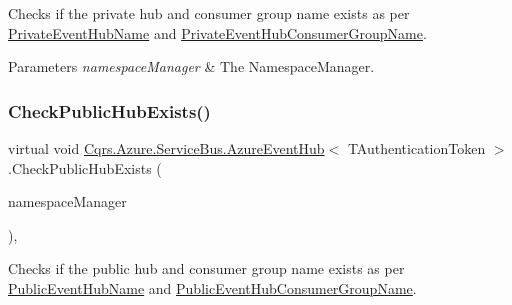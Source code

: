 Checks if the private hub and consumer group name exists as per \hyperlink{classCqrs_1_1Azure_1_1ServiceBus_1_1AzureEventHub_ac6802047e00a92ea4b0ae6b69ef7310a_ac6802047e00a92ea4b0ae6b69ef7310a}{Private\+Event\+Hub\+Name} and \hyperlink{classCqrs_1_1Azure_1_1ServiceBus_1_1AzureEventHub_a0c091d0cb19dda3e8bfc20f0e7d30af3_a0c091d0cb19dda3e8bfc20f0e7d30af3}{Private\+Event\+Hub\+Consumer\+Group\+Name}. 


\begin{DoxyParams}{Parameters}
{\em namespace\+Manager} & The Namespace\+Manager.\\
\hline
\end{DoxyParams}
\mbox{\label{classCqrs_1_1Azure_1_1ServiceBus_1_1AzureEventHub_ae60a7cddcb566ff8f5cf2ac2db17733e_ae60a7cddcb566ff8f5cf2ac2db17733e}} 
\subsubsection{\texorpdfstring{Check\+Public\+Hub\+Exists()}{CheckPublicHubExists()}}
{\footnotesize\ttfamily virtual void \hyperlink{classCqrs_1_1Azure_1_1ServiceBus_1_1AzureEventHub}{Cqrs.\+Azure.\+Service\+Bus.\+Azure\+Event\+Hub}$<$ T\+Authentication\+Token $>$.Check\+Public\+Hub\+Exists (\begin{DoxyParamCaption}\item[{Namespace\+Manager}]{namespace\+Manager }\end{DoxyParamCaption})\hspace{0.3cm}{\ttfamily [protected]}, {\ttfamily [virtual]}}



Checks if the public hub and consumer group name exists as per \hyperlink{classCqrs_1_1Azure_1_1ServiceBus_1_1AzureEventHub_a6012f2290f9397929e9d6d5419963482_a6012f2290f9397929e9d6d5419963482}{Public\+Event\+Hub\+Name} and \hyperlink{classCqrs_1_1Azure_1_1ServiceBus_1_1AzureEventHub_a505c495eb73e4f888431d408e0b0d8ab_a505c495eb73e4f888431d408e0b0d8ab}{Public\+Event\+Hub\+Consumer\+Group\+Name}. 


